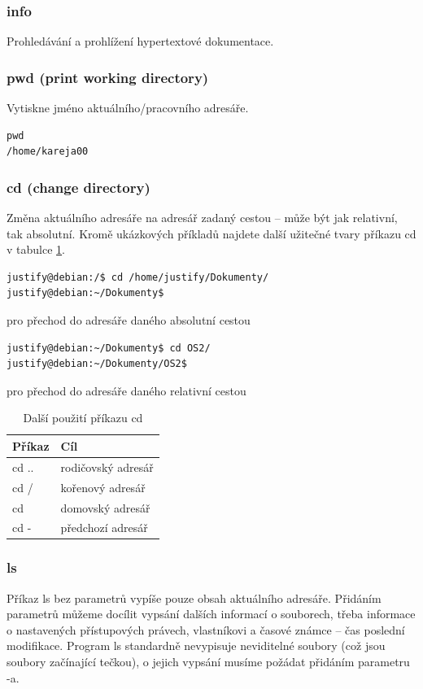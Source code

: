 \documentclass{article}
\begin{document}
\subsubsection{info}	
Prohledávání a prohlížení hypertextové dokumentace.

\subsubsection{pwd (print working directory)}
Vytiskne jméno aktuálního/pracovního adresáře.
\begin{verbatim}
pwd
/home/kareja00
\end{verbatim}

\subsubsection{cd (change directory)}
Změna aktuálního adresáře na adresář zadaný cestou -- může být jak relativní, tak absolutní. Kromě ukázkových příkladů najdete další užitečné tvary příkazu cd v tabulce \ref{tabcd}.
\begin{verbatim}
justify@debian:/$ cd /home/justify/Dokumenty/
justify@debian:~/Dokumenty$
\end{verbatim}
pro přechod do adresáře daného absolutní cestou

\begin{verbatim}
justify@debian:~/Dokumenty$ cd OS2/
justify@debian:~/Dokumenty/OS2$
\end{verbatim}
pro přechod do adresáře daného relativní cestou
\begin{table}
\begin{center}
\begin{tabular}{l | l}
Příkaz & Cíl\\
\hline
cd .. & rodičovský adresář\\
cd / & kořenový adresář\\
cd & domovský adresář\\
cd - & předchozí adresář\\
\end{tabular}
\end{center}
\caption{Další použití příkazu cd}
\label{tabcd}
\end{table}

\subsubsection{ls}
Příkaz ls bez parametrů vypíše pouze obsah aktuálního adresáře. Přidáním parametrů můžeme docílit vypsání dalších informací o souborech, třeba informace o nastavených přístupových právech, vlastníkovi a časové známce -- čas poslední modifikace. Program ls standardně nevypisuje neviditelné soubory (což jsou soubory začínající tečkou), o jejich vypsání musíme požádat přidáním parametru -a. 
\end{document}
